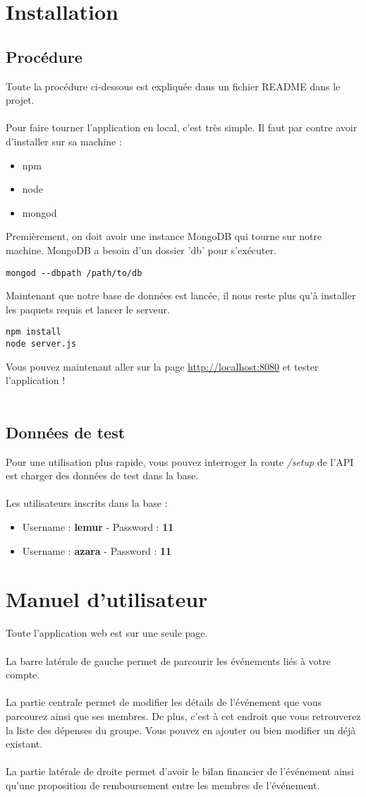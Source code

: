 \documentclass[a4paper]{report}
\begin{document}
\chapter{Installation}
\section{Procédure}
Toute la procédure ci-dessous est expliquée dans un fichier README dans le projet.\\\\
Pour faire tourner l'application en local, c'est très simple. Il faut par contre avoir d'installer sur sa machine :
\begin{itemize}
\item npm
\item node
\item mongod
\end{itemize}
Premièrement, on doit avoir une instance MongoDB qui tourne sur notre machine. MongoDB a besoin d'un dossier 'db' pour s'exécuter.
\begin{verbatim}
mongod --dbpath /path/to/db
\end{verbatim}
Maintenant que notre base de données est lancée, il nous reste plus qu'à installer les paquets requis et lancer le serveur.
\begin{verbatim}
npm install
node server.js
\end{verbatim}
Vous pouvez maintenant aller sur la page \url{http://localhost:8080} et tester l'application !\\\\
\section{Données de test}
Pour une utilisation plus rapide, vous pouvez interroger la route \textit{/setup} de l'API est charger des données de test dans la base.\\\\
Les utilisateurs inscrits dans la base :
\begin{itemize}
\item Username : \textbf{lemur} - Password : \textbf{11}
\item Username : \textbf{azara} - Password : \textbf{11}
\end{itemize}

\chapter{Manuel d'utilisateur}
Toute l'application web est sur une seule page.\\\\
La barre latérale de gauche permet de parcourir les événements liés à votre compte.\\\\
La partie centrale permet de modifier les détails de l'événement que vous parcourez ainsi que ses membres.
De plus, c'est à cet endroit que vous retrouverez la liste des dépenses du groupe. Vous pouvez en ajouter ou bien modifier un déjà existant.\\\\
La partie latérale de droite permet d'avoir le bilan financier de l'événement ainsi qu'une proposition de remboursement entre les membres de l'événement.
\end{document}
